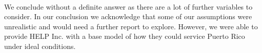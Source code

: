 \paragraph{} We conclude without a definite answer as there are a lot of further variables to consider. In our conclusion we acknowledge that some of our assumptions were unrealistic and would need a further report to explore. However, we were able to provide HELP Inc. with a base model of how they could service Puerto Rico under ideal conditions. 